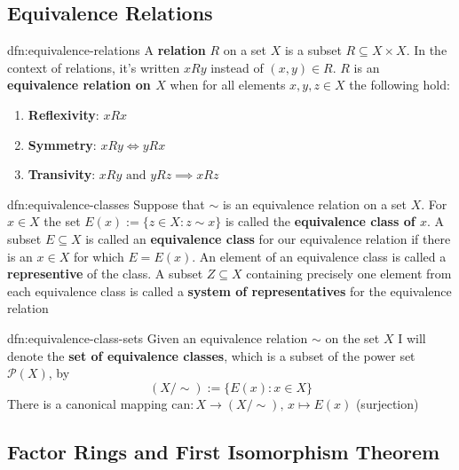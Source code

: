\documentclass[landscape, 8pt]{extarticle}
\begin{document}
\begin{multicols}{3}
\subsection{Equivalence Relations}

\begin{dfn}{dfn:equivalence-relations}{}
    A \textbf{relation} $R$ on a set $X$ is a subset $R \subseteq X \times X $. In the context of relations, it's written $xRy$ instead of $(x,y)\in R$. $R$ is an \textbf{equivalence relation on $X$} when for all elements $x, y, z\in X$ the following hold:
    \begin{enumerate}
        \setlength\itemsep{0em}
        \item \textbf{Reflexivity}: $xRx$
        \item \textbf{Symmetry}: $xRy \iff yRx$
        \item \textbf{Transivity}: $xRy \text{ and } yRz \implies xRz$
    \end{enumerate}
\end{dfn}

\begin{dfn}{dfn:equivalence-classes}{}
    Suppose that $\sim$ is an equivalence relation on a set $X$. For $x\in X$ the set $E(x) := \{z\in X : z \sim x\}$ is called the \textbf{equivalence class of $x$}. A subset $E \subseteq X$ is called an \textbf{equivalence class} for our equivalence relation if there is an $x\in X$ for which $E = E(x)$. An element of an equivalence class is called a \textbf{representive} of the class. A subset $Z \subseteq X$ containing precisely one element from each equivalence class is called a \textbf{system of representatives} for the equivalence relation
\end{dfn}

\begin{dfn}{dfn:equivalence-class-sets}{}
    Given an equivalence relation $\sim$ on the set $X$ I will denote the \textbf{set of equivalence classes}, which is a subset of the power set $\mathcal{P}(X)$, by
    \[(X / \sim) := \{E(x) : x\in X\}\]
    There is a canonical mapping $\text{can}: X \to (X / \sim),\, x\mapsto E(x)$ (surjection)
\end{dfn}

\subsection{Factor Rings and First Isomorphism Theorem}


\end{multicols}
\end{document}
